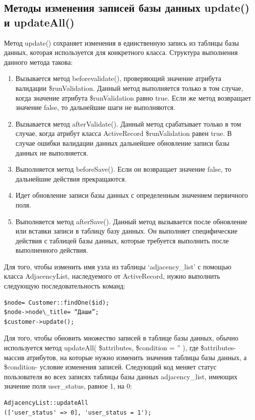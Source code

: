 \documentclass[a4paper,14pt]{extreport}
\theoremstyle{definition}
\begin{document}
\subsection{Методы изменения записей базы данных update() и updateAll()}
Метод update() сохраняет изменения в единственную запись из таблицы базы данных, которая используется для конкретного класса. Структура выполнения данного метода такова:
\begin{enumerate}
\item	Вызывается метод beforevalidate(), проверяющий значение атрибута валидации \$runValidation. Данный метод выполняется только в том случае, когда значение атрибута \$runValidation равно true. Если же метод возвращает значение false, то дальнейшие шаги не выполняются.
\item	Вызывается метод afterValidate(). Данный метод срабатывает только в том случае, когда атрибут класса ActiveRecord \$runValidation равен true. В случае ошибки валидации данных дальнейшее обновление записи базы данных не выполняется.
\item	Выполняется метод beforeSave(). Если он возвращает значение false, то дальнейшие действия прекращаются.
\item	Идет обновление записи базы данных с определенным значением первичного поля.
\item	Выполняется метод afterSave(). Данный метод вызывается после обновление или вставки записи в таблицу базу данных. Он выполняет специфические действия с таблицей базы данных, которые требуется выполнить после выполненного действия.
\end{enumerate}
Для того, чтобы изменить имя узла из таблицы ‘adjacency\_list’ с помощью класса AdjacencyList, наследуемого от ActiveRecord, нужно выполнить следующую последовательность команд:\begin{verbatim}$node= Customer::findOne($id);
$node->node\_title= “Даши”;
$customer->update();\end{verbatim}Для того, чтобы обновить множество записей в таблице базы данных, обычно используется метод updateAll( \$attributes, \$condition = '' ), где \$attributes- массив атрибутов, на которые нужно изменить значения таблицы базы данных, а \$condition- условие изменения записей. Следующий код меняет статус пользователя во всех записях таблицы базы данных adjacency\_list, имеющих значение поля user\_status, равное 1, на 0:
\begin{verbatim}AdjacencyList::updateAll
(['user_status' => 0], 'user_status = 1');\end{verbatim}
\end{document}
